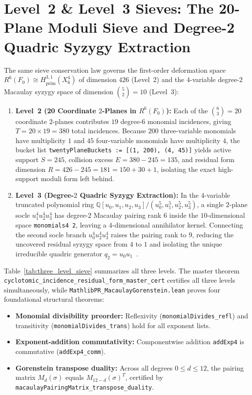 \documentclass[11pt,a4paper]{article}
\begin{document}
\section{Level~2 \& Level~3 Sieves: The 20-Plane Moduli Sieve and Degree-2 Quadric Syzygy Extraction}

The same sieve conservation law governs the first-order deformation space $R^6(F_0) \cong H^{3,1}_{\mathrm{prim}}(X_6^4)$ of dimension $426$ (Level~2) and the $4$-variable degree-$2$ Macaulay syzygy space of dimension $\binom{5}{2} = 10$ (Level~3):

\begin{enumerate}
  \item \textbf{Level~2 (20 Coordinate $2$-Planes in $R^6(F_0)$):} Each of the $\binom{6}{3} = 20$ coordinate $2$-planes contributes $19$ degree-$6$ monomial incidences, giving $T = 20 \times 19 = 380$ total incidences. Because $200$ three-variable monomials have multiplicity $1$ and $45$ four-variable monomials have multiplicity $4$, the bucket list \texttt{twentyPlaneBuckets := [(1, 200), (4, 45)]} yields active support $S = 245$, collision excess $E = 380 - 245 = 135$, and residual form dimension $R = 426 - 245 = 181 = 150 + 30 + 1$, isolating the exact high-support moduli form left behind.
  \item \textbf{Level~3 (Degree-$2$ Quadric Syzygy Extraction):} In the $4$-variable truncated polynomial ring $\mathbb{Q}[u_0, u_1, u_2, u_3] / (u_0^5, u_1^5, u_2^5, u_3^5)$, a single $2$-plane socle $u_1^4 u_2^4 u_3^4$ has degree-$2$ Macaulay pairing rank $6$ inside the $10$-dimensional space \texttt{monomials4 2}, leaving a $4$-dimensional annihilator kernel. Connecting the second socle branch $u_0^4 u_2^4 u_3^4$ raises the pairing rank to $9$, reducing the uncovered residual syzygy space from $4$ to $1$ and isolating the unique irreducible quadric generator $q_2 = u_0 u_1$~\cite{Macaulay1916,Voisin2002}.
\end{enumerate}

Table~\ref{tab:three_level_sieve} summarizes all three levels. The master theorem \\ \texttt{cyclotomic\_incidence\_residual\_form\_master\_cert} certifies all three levels simultaneously, while \texttt{MathlibPR\_MacaulayGorenstein.lean} proves four foundational structural theorems:
\begin{itemize}
  \item \textbf{Monomial divisibility preorder:} Reflexivity (\texttt{monomialDivides\_refl}) and transitivity (\texttt{monomialDivides\_trans}) hold for all exponent lists.
  \item \textbf{Exponent-addition commutativity:} Componentwise addition \texttt{addExp4} is commutative (\texttt{addExp4\_comm}).
  \item \textbf{Gorenstein transpose duality:} Across all degrees $0 \le d \le 12$, the pairing matrix $M_d(\sigma)$ equals $M_{12-d}(\sigma)^T$, certified by \texttt{macaulayPairingMatrix\_transpose\_duality}.
\end{itemize}
\end{document}
